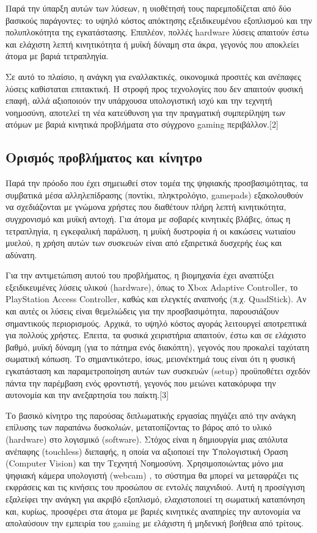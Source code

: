 \documentclass[twoside, a4paper, 11pt]{article}
\begin{document}
Παρά την ύπαρξη αυτών των λύσεων, η υιοθέτησή τους παρεμποδίζεται από δύο βασικούς παράγοντες: το
υψηλό κόστος απόκτησης εξειδικευμένου εξοπλισμού και την πολυπλοκότητα της εγκατάστασης. Επιπλέον, πολλές hardware λύσεις απαιτούν έστω και ελάχιστη λεπτή κινητικότητα ή μυϊκή δύναμη στα
άκρα, γεγονός που αποκλείει άτομα με βαριά τετραπληγία.

Σε αυτό το πλαίσιο, η ανάγκη για εναλλακτικές, οικονομικά προσιτές και ανέπαφες λύσεις καθίσταται
επιτακτική. Η στροφή προς τεχνολογίες που δεν απαιτούν φυσική επαφή, αλλά αξιοποιούν την υπάρχουσα υπολογιστική ισχύ και την τεχνητή νοημοσύνη, αποτελεί τη νέα κατεύθυνση για την πραγματική
συμπερίληψη των ατόμων με βαριά κινητικά προβλήματα στο σύγχρονο gaming περιβάλλον.[2]

\subsection{Ορισμός προβλήματος και κίνητρο}
Παρά την πρόοδο που έχει σημειωθεί στον τομέα της ψηφιακής προσβασιμότητας, τα συμβατικά μέσα
αλληλεπίδρασης (ποντίκι, πληκτρολόγιο, gamepads) εξακολουθούν να σχεδιάζονται με γνώμονα χρήστες
που διαθέτουν πλήρη λεπτή κινητικότητα, συγχρονισμό και μυϊκή αντοχή. Για άτομα με σοβαρές κινητικές βλάβες, όπως η τετραπληγία, η εγκεφαλική παράλυση, η μυϊκή δυστροφία ή οι κακώσεις νωτιαίου
μυελού, η χρήση αυτών των συσκευών είναι από εξαιρετικά δυσχερής έως και αδύνατη.

Για την αντιμετώπιση αυτού του προβλήματος, η βιομηχανία έχει αναπτύξει εξειδικευμένες λύσεις υλικού
(hardware), όπως το Xbox Adaptive Controller, το PlayStation Access Controller, καθώς και ελεγκτές
αναπνοής (π.χ. QuadStick). Αν και αυτές οι λύσεις είναι θεμελιώδεις για την προσβασιμότητα, παρουσιάζουν σημαντικούς περιορισμούς. Αρχικά, το υψηλό κόστος αγοράς λειτουργεί αποτρεπτικά για πολλούς
χρήστες. Έπειτα, τα φυσικά χειριστήρια απαιτούν, έστω και σε ελάχιστο βαθμό, μυϊκή δύναμη (για το
πάτημα ενός διακόπτη), γεγονός που προκαλεί ταχύτατη σωματική κόπωση. Το σημαντικότερο, ίσως,
μειονέκτημά τους είναι ότι η φυσική εγκατάσταση και παραμετροποίηση αυτών των συσκευών (setup)
προϋποθέτει σχεδόν πάντα την παρέμβαση ενός φροντιστή, γεγονός που μειώνει κατακόρυφα την αυτονομία και την ανεξαρτησία του παίκτη.[3]

Το βασικό κίνητρο της παρούσας διπλωματικής εργασίας πηγάζει από την ανάγκη επίλυσης των παραπάνω δυσκολιών, μετατοπίζοντας το βάρος από το υλικό (hardware) στο λογισμικό (software).
Στόχος είναι η δημιουργία μιας απόλυτα ανέπαφης (touchless) διεπαφής, η οποία να αξιοποιεί την Υπολογιστική Όραση (Computer Vision) και την Τεχνητή Νοημοσύνη. Χρησιμοποιώντας μόνο μια ψηφιακή κάμερα υπολογιστή (webcam) , το σύστημα θα μπορεί να μεταφράζει τις εκφράσεις και τις κινήσεις του προσώπου σε εντολές παιχνιδιού. Αυτή η προσέγγιση εξαλείφει την ανάγκη για ακριβό εξοπλισμό, ελαχιστοποιεί τη σωματική καταπόνηση και, κυρίως, προσφέρει στα άτομα με βαριές κινητικές αναπηρίες την αυτονομία να απολαύσουν την εμπειρία του gaming με ελάχιστη ή μηδενική βοήθεια από τρίτους.
\end{document}
